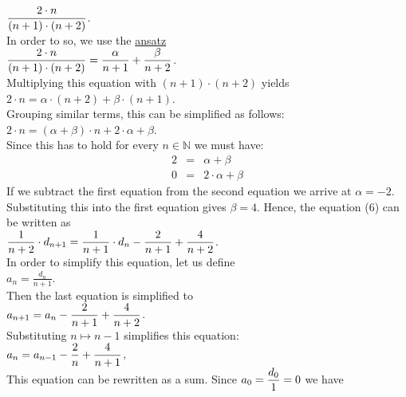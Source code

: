 $\displaystyle\frac{2\cdot n}{(n+1)\cdot(n+2)}$.
\\[0.2cm] 
In order to so, we use the \href{http://en.wikipedia.org/wiki/Ansatz}{ansatz}
\\[0.2cm]
\hspace*{1.3cm}
$\displaystyle\frac{2\cdot n}{(n+1)\cdot(n+2)} = \frac{\alpha}{n+1} + \frac{\beta}{n+2}$.
\\[0.2cm] 
Multiplying this equation with $(n+1) \cdot (n+2)$ yields
\\[0.2cm]
\hspace*{1.3cm}
$ 2\cdot n = \alpha \cdot (n+2) + \beta \cdot (n+1)$.
\\[0.2cm]
Grouping similar terms, this can be simplified as follows:
\\[0.2cm]
\hspace*{1.3cm}
$2\cdot n = (\alpha + \beta) \cdot n + 2 \cdot \alpha  + \beta$.
\\[0.2cm]
Since this has to hold for every $n \in \mathbb{N}$ we must have:
\begin{eqnarray*}
  2 & = & \alpha + \beta \\
  0 & = & 2 \cdot \alpha + \beta 
\end{eqnarray*}
If we subtract the first equation from the second equation we arrive at
 $\alpha = -2$.  Substituting this into the first equation gives $\beta = 4$.
Hence, the equation (6) can be written as
\\[0.2cm]
\hspace*{1.3cm}
$\displaystyle\frac{1}{n+2} \cdot d_{n+1} = \frac{1}{n+1}\cdot d_{n} - \frac{2}{n+1} + \frac{4}{n+2}$.  
\\[0.2cm]  
In order to simplify this equation, let us define
\\[0.2cm]
\hspace*{1.3cm}
 $\displaystyle a_n = \frac{d_n}{n+1}$. 
\\[0.2cm] 
Then the last equation is simplified to
\\[0.2cm]
\hspace*{1.3cm}
$\displaystyle a_{n+1} = a_{n} - \frac{2}{n+1} + \frac{4}{n+2}$.
\\[0.2cm] 
Substituting $n \mapsto n-1$ simplifies this equation: 
\\[0.2cm]
\hspace*{1.3cm}
$\displaystyle a_{n} = a_{n-1} - \frac{2}{n} + \frac{4}{n+1}$,
\\[0.2cm] 
This equation can be rewritten as a sum.  Since $a_0 = \displaystyle\frac{d_0}{1} = 0$
we have
\\[0.2cm]
\hspace*{1.3cm}
